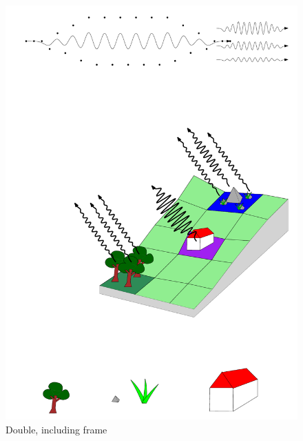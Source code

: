 \begin{figure}[!hb]
	\centering 
	\includegraphics[width=0.45\linewidth,trim={2cm 6cm 0cm 8cm},clip]{figures/example1/figure} %
	\caption{Double, including frame}
	\label{fig:double_example1}
\end{figure}



